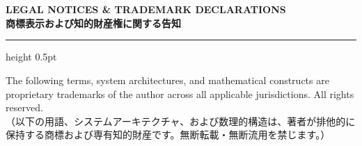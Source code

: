 \chapter*{}
\thispagestyle{empty}

\vspace*{\fill}

\begin{legalframe}
\centering

{\normalsize \textbf{LEGAL NOTICES \& TRADEMARK DECLARATIONS}}\\[2pt]
{\scriptsize \textbf{商標表示および知的財産権に関する告知}}

\vspace{8pt}
\hrule height 0.5pt
\vspace{8pt}

\begin{flushleft}
\scriptsize
The following terms, system architectures, and mathematical constructs are proprietary trademarks of the author across all applicable jurisdictions. All rights reserved.\\
\tiny
（以下の用語、システムアーキテクチャ、および数理的構造は、著者が排他的に保持する商標および専有知的財産です。無断転載・無断流用を禁じます。）
\end{flushleft}


\end{legalframe}
